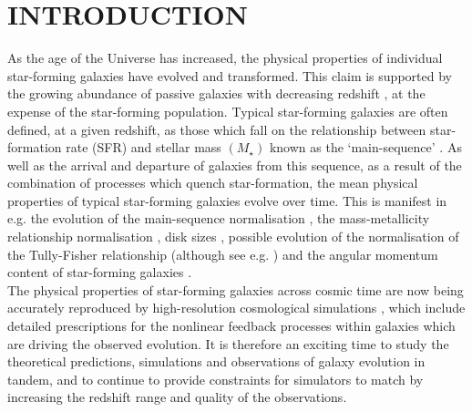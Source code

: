 \documentclass[fleqn,usenatbib]{mnras}
\begin{document}

\section{INTRODUCTION}
As the age of the Universe has increased, the physical properties of individual star-forming galaxies have evolved and transformed.
This claim is supported by the growing abundance of passive galaxies with decreasing redshift \citep[e.g.][]{Bell2004,Brammer2011,Muzzin2013}, at the expense of the star-forming population.
Typical star-forming galaxies are often defined, at a given redshift, as those which fall on the relationship between star-formation rate (SFR) and stellar mass $(M_{\star})$ known as the `main-sequence' \citep[e.g.][]{Daddi2007,Noeske2007,Elbaz2007}.
As well as the arrival and departure of galaxies from this sequence, as a result of the combination of processes which quench star-formation, the mean physical properties of typical star-forming galaxies evolve over time.
This is manifest in e.g. the evolution of the main-sequence normalisation \citep[e.g.][]{Whitaker2012}, the mass-metallicity relationship normalisation \citep[e.g.][]{Erb_2006,Maiolino2008}, disk sizes \citep[e.g.][]{Trujillo2007,VanderWel2014a}, possible evolution of the normalisation of the Tully-Fisher relationship \citep[e.g.][]{Cresci2009,Puech2010} (although see e.g. \citealt{Miller2011,Miller2012,Harrison2017}) and the angular momentum content of star-forming galaxies \citep[e.g.][]{Romanowsky2012,Obreschkow2016,Swinbank2017}. \\
\noindent
The physical properties of star-forming galaxies across cosmic time are now being accurately reproduced by high-resolution cosmological simulations \citep[e.g.][]{Schaye2015,Genel2015,Lagos2017,Swinbank2017}, which include detailed prescriptions for the nonlinear feedback processes within galaxies which are driving the observed evolution.
It is therefore an exciting time to study the theoretical predictions, simulations and observations of galaxy evolution in tandem, and to continue to provide constraints for simulators to match by increasing the redshift range and quality of the observations.  \\
\end{document}
